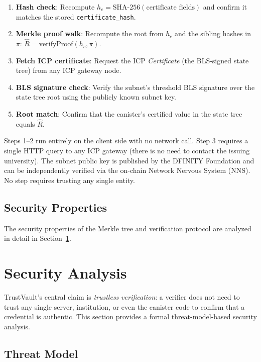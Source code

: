 \documentclass[journal]{IEEEtran}
\begin{document}
\begin{enumerate}
  \item \textbf{Hash check}: Recompute $h_c = \text{SHA-256}(\text{certificate fields})$ and confirm it matches the stored \texttt{certificate\_hash}.
  \item \textbf{Merkle proof walk}: Recompute the root from $h_c$ and the sibling hashes in $\pi$: $\hat{R} = \text{verifyProof}(h_c, \pi)$.
  \item \textbf{Fetch ICP certificate}: Request the ICP \emph{Certificate} (the BLS-signed state tree) from any ICP gateway node.
  \item \textbf{BLS signature check}: Verify the subnet's threshold BLS signature over the state tree root using the publicly known subnet key.
  \item \textbf{Root match}: Confirm that the canister's certified value in the state tree equals $\hat{R}$.
\end{enumerate}

Steps 1--2 run entirely on the client side with no network call. Step 3 requires a single HTTP query to any ICP gateway (there is no need to contact the issuing university). The subnet public key is published by the DFINITY Foundation and can be independently verified via the on-chain Network Nervous System (NNS). No step requires trusting any single entity.

\subsection{Security Properties}
\label{subsec:secprop}

The security properties of the Merkle tree and verification protocol are analyzed in detail in Section~\ref{sec:security}.

\section{Security Analysis}
\label{sec:security}

TrustVault's central claim is \emph{trustless verification}: a verifier does not need to trust any single server, institution, or even the canister code to confirm that a credential is authentic. This section provides a formal threat-model-based security analysis.

\subsection{Threat Model}
\end{document}
